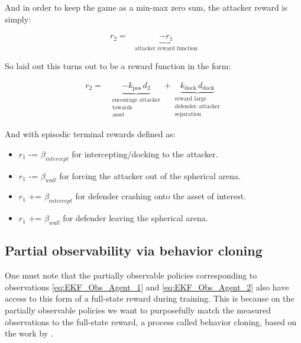 And in order to keep the game as a min-max zero sum, the attacker reward is simply: 

\[
\boxed{
\begin{aligned}
r_2
= {}&
\underbrace{-r_1}_{\text{attacker reward function}}
\end{aligned}
}
\]

So laid out this turns out to be a reward function in the form:

\begin{equation}
\label{eq:defender_step_reward}
\boxed{
\begin{aligned}
r_2
= {}&
\underbrace{-k_{\text{pos}}\, d_2}_{\substack{\text{encourage attacker}\\\text{towards}\\\text{asset}}}
+
\underbrace{k_{\text{dock}}\, d_{\text{dock}}}_{\substack{\text{reward large}\\\text{defender--attacker}\\\text{separation}}}
\end{aligned}
}
\end{equation}

And with episodic terminal rewards defined as:

\begin{itemize}
    \item $r_1$ -= $\beta_{intercept}$ for intercepting/docking to the attacker.
    \item $r_1$ -= $\beta_{wall}$ for forcing the attacker out of the spherical arena.
    \item $r_1$ += $\beta_{intercept}$ for defender crashing onto the asset of interest.
    \item $r_1$ += $\beta_{wall}$ for defender leaving the spherical arena.
    
\end{itemize}

\subsection{Partial observability via behavior cloning}
\label{subsec:partial-observability-behavior-cloning}

One must note that the partially observable policies corresponding to observations \ref{eq:EKF_Obs_Agent_1} and \ref{eq:EKF_Obs_Agent_2} also have access to this form of a full-state reward during training. This is because on the partially observable policies we want to purposefully match the measured observations to the full-state reward, a process called behavior cloning, based on the work by \cite{ross2011reduction}.


